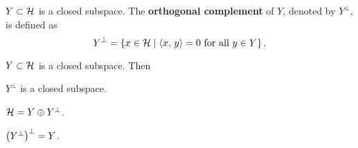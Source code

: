 \begin{definition}
    $Y\subset\mathcal{H}$ is a closed subspace. The \textbf{orthogonal complement} of 
    $Y$, denoted by $Y^\perp$, is defined as 
    \begin{equation*}
        Y^\perp = \left\{ x\in\mathcal{H} \;\middle\vert\; \left\langle {x},\, {y} \right\rangle = 0\text{ for all }y\in Y \right\}.
    \end{equation*}
\end{definition}

\begin{proposition}
    $Y\subset\mathcal{H}$ is a closed subspace. Then 
    \begin{thmenum}
        \item $Y^\perp$ is a closed subspace. 
        \item $\mathcal{H} = Y\oplus Y^\perp$.
        \item $\pth{Y^\perp}^\perp = Y$.
    \end{thmenum}
\end{proposition}
